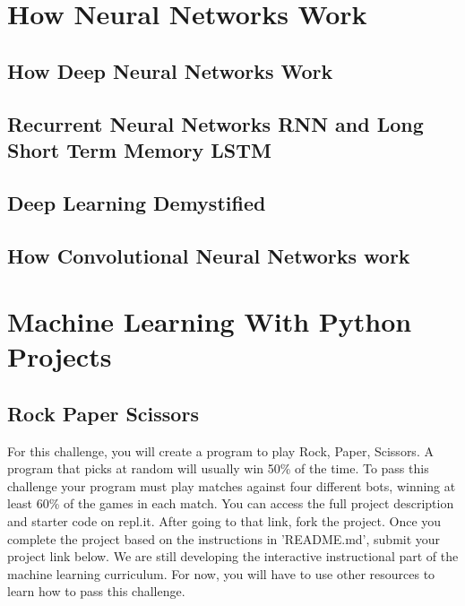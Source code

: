 \documentclass{article}%
\begin{document}
\section{How Neural Networks Work}%
\label{sec:HowNeuralNetworksWork}%
\subsection{How Deep Neural Networks Work}%
\label{subsec:HowDeepNeuralNetworksWork}%

%
\subsection{Recurrent Neural Networks RNN and Long Short Term Memory LSTM}%
\label{subsec:RecurrentNeuralNetworksRNNandLongShortTermMemoryLSTM}%

%
\subsection{Deep Learning Demystified}%
\label{subsec:DeepLearningDemystified}%

%
\subsection{How Convolutional Neural Networks work}%
\label{subsec:HowConvolutionalNeuralNetworkswork}%

%
\newpage%
\section{Machine Learning With Python Projects}%
\label{sec:MachineLearningWithPythonProjects}%
\subsection{Rock Paper Scissors}%
\label{subsec:RockPaperScissors}%
For this challenge, you will create a program to play Rock, Paper, Scissors. A program that picks at random will usually win 50\% of the time. To pass this challenge your program must play matches against four different bots, winning at least 60\% of the games in each match.\newline%
You can access the full project description and starter code on repl.it.\newline%
After going to that link, fork the project. Once you complete the project based on the instructions in 'README.md', submit your project link below.\newline%
We are still developing the interactive instructional part of the machine learning curriculum. For now, you will have to use other resources to learn how to pass this challenge.\newline%
\end{document}
